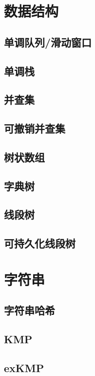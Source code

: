 \documentclass[twocolumn,a4]{article}
\newcommand{\addcpp}[1]{}
\begin{document}
\section{数据结构}
	\subsection{单调队列/滑动窗口}
		\addcpp{ds/SlidingWindow.tex}
	\subsection{单调栈}
		\addcpp{ds/mono-stack.tex}
	\subsection{并查集}
		\addcpp{ds/dsu.tex}
	\subsection{可撤销并查集}
		\addcpp{graph/undodsu.tex}
	\subsection{树状数组}
		\addcpp{ds/fenwick.tex}
	\subsection{字典树}
		\addcpp{ds/trie.tex}
	\subsection{线段树}
		\addcpp{ds/segment_tree.tex}
	\subsection{可持久化线段树}
		\addcpp{ds/hjt_tree.tex}
		
\section{字符串}
	\subsection{字符串哈希}
		\addcpp{string/string_hash.tex}
	\subsection{KMP}
		\addcpp{string/KMP.tex}
	\subsection{exKMP}
		\addcpp{string/exKMP.tex}
\end{document}
